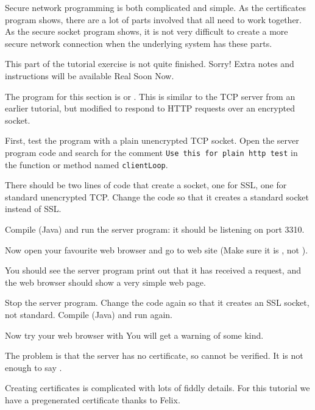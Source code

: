 Secure network programming is both complicated and simple. As the certificates
program shows, there are a lot of parts involved that all need to work together.
As the secure socket program shows, it is not very difficult to create a more
secure network connection when the underlying system has these parts.



\begin{IMPORTANT}
This part of the tutorial exercise is not quite finished. Sorry! Extra notes
and instructions will be available Real Soon Now.
\end{IMPORTANT}

\STEP The program for this section is  or .
This is similar to the TCP server from an earlier tutorial, but modified to
respond to HTTP requests over an encrypted socket.

\STEP First, test the program with a plain unencrypted TCP socket. Open the server
program code and search for the comment \texttt{Use this for plain http test}
in the function or method named \texttt{clientLoop}.

There should be two lines of code that create a socket, one for SSL, one for
standard unencrypted TCP. Change the code so that it creates a standard socket
instead of SSL.

Compile (Java) and run the server program: it should be listening on port 3310.

Now open your favourite web browser and go to web site
(Make sure it is , not ).

You should see the server program print out that it has received a request, and
the web browser should show a very simple web page.

\STEP Stop the server program. Change the code again so that it creates an SSL
socket, not standard. Compile (Java) and run again.

Now try your web browser with
You will get a warning of some kind.

The problem is that the server has no certificate, so cannot be verified.
It is not enough to say .



Creating certificates is complicated with lots of fiddly details. For this tutorial
we have a pregenerated certificate thanks to Felix.

